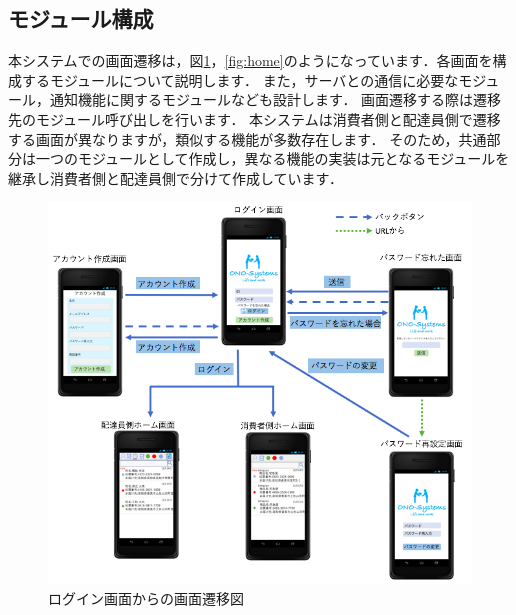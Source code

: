 \documentclass[a4j,titlepage]{jarticle}
\begin{document}
\subsection{モジュール構成}
本システムでの画面遷移は，図\ref{fig:login}，\ref{fig:home}のようになっています．各画面を構成するモジュールについて説明します．
また，サーバとの通信に必要なモジュール，通知機能に関するモジュールなども設計します．
画面遷移する際は遷移先のモジュール呼び出しを行います．
本システムは消費者側と配達員側で遷移する画面が異なりますが，類似する機能が多数存在します．
そのため，共通部分は一つのモジュールとして作成し，異なる機能の実装は元となるモジュールを継承し消費者側と配達員側で分けて作成しています．
\begin{figure}[H]
 \begin{center}
  \includegraphics[width=150mm]{screen_transition_login.png}
  \caption{ログイン画面からの画面遷移図}
  \label{fig:login}
 \end{center}
\end{figure}
\end{document}
